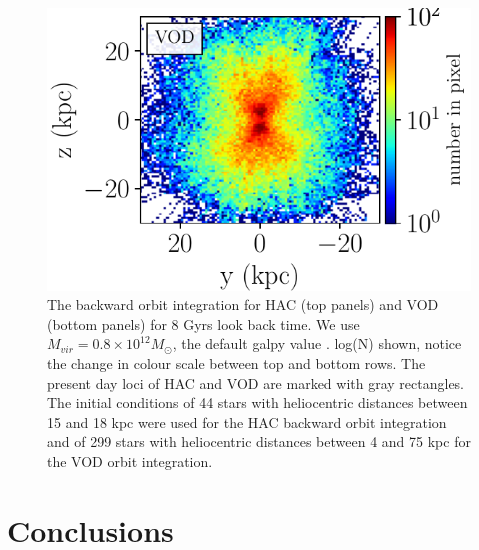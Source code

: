 \documentclass[fleqn,usenatbib]{mnras}
\begin{document}
\begin{figure}
             \includegraphics[scale=0.302]{VOD_orbits_8Gyrs_yz_sausage.pdf}
	     	     	     \vspace{-0.5cm}
   \caption{The backward orbit integration for HAC (top panels) and VOD (bottom panels) for 8 Gyrs look back time. We use $M_{vir} = 0.8 \times 10^{12} M_{\odot}$, the default galpy value . log(N) shown, notice the change in colour scale between top and bottom rows. The present day loci of  HAC and VOD are marked with gray rectangles. The initial conditions of 44 stars with heliocentric distances between 15 and 18 kpc were used for the HAC backward orbit integration and of 299 stars with heliocentric distances between 4 and 75 kpc for the VOD orbit integration.}
    \label{fig:backorbits}
\end{figure}
%

\section{Conclusions}
\end{document}
